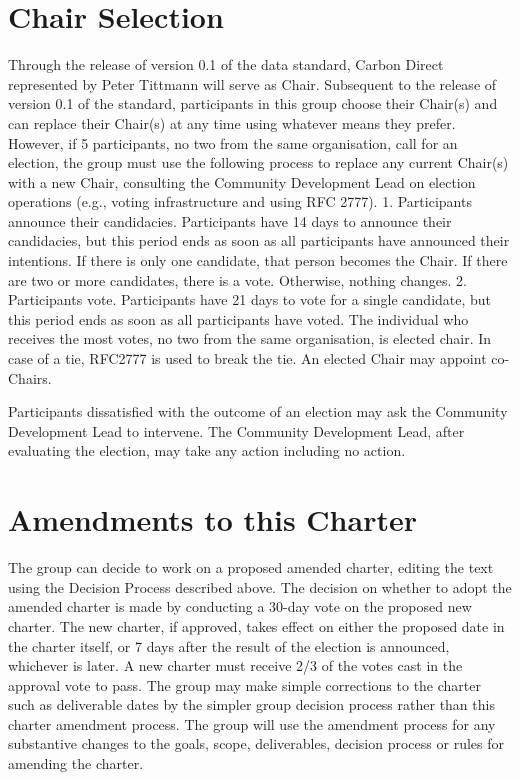 \documentclass[title=small,preset=opensansnote,par=skip]{article}
\begin{document}
\section{Chair Selection}
\label{sec:org22b1576}

Through the release of version 0.1 of the data standard, Carbon Direct represented by Peter Tittmann will serve as Chair. Subsequent to the release of version 0.1 of the standard, participants in this group choose their Chair(s) and can replace their Chair(s) at any time using whatever means they prefer. However, if 5 participants, no two from the same organisation, call for an election, the group must use the following process to replace any current Chair(s) with a new Chair, consulting the Community Development Lead on election operations (e.g., voting infrastructure and using RFC 2777). 1. Participants announce their candidacies. Participants have 14 days to announce their candidacies, but this period ends as soon as all participants have announced their intentions. If there is only one candidate, that person becomes the Chair. If there are two or more candidates, there is a vote. Otherwise, nothing changes. 2. Participants vote. Participants have 21 days to vote for a single candidate, but this period ends as soon as all participants have voted. The individual who receives the most votes, no two from the same organisation, is elected chair. In case of a tie, RFC2777 is used to break the tie. An elected Chair may appoint co-Chairs.

Participants dissatisfied with the outcome of an election may ask the Community Development Lead to intervene. The Community Development Lead, after evaluating the election, may take any action including no action.
\section{Amendments to this Charter}
\label{sec:org164ef57}

The group can decide to work on a proposed amended charter, editing the text using the Decision Process described above. The decision on whether to adopt the amended charter is made by conducting a 30-day vote on the proposed new charter. The new charter, if approved, takes effect on either the proposed date in the charter itself, or 7 days after the result of the election is announced, whichever is later. A new charter must receive 2/3 of the votes cast in the approval vote to pass. The group may make simple corrections to the charter such as deliverable dates by the simpler group decision process rather than this charter amendment process. The group will use the amendment process for any substantive changes to the goals, scope, deliverables, decision process or rules for amending the charter.
\end{document}
